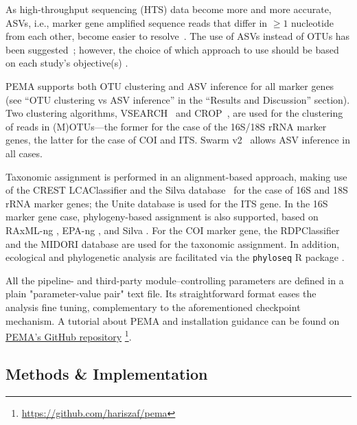    As high-throughput sequencing (HTS) data become more and more accurate, ASVs, i.e., marker gene amplified sequence reads that differ in $≥1$ nucleotide from each other, become easier to resolve~\citep{callahan2017exact}. 
   The use of ASVs instead of OTUs has been suggested~\citep{callahan2017exact}; 
   however, the choice of which approach to use should be based on each study's objective(s) \citep{pauvert2019bioinformatics}.
   
   PEMA supports both OTU clustering and ASV inference for all marker genes 
   (see “OTU clustering vs ASV inference” in the “Results and Discussion” section). 
   Two clustering algorithms, VSEARCH~\citep{rognes2016vsearch} and CROP~\citep{hao2011clustering}, are used for the clustering of reads in (M)OTUs—the former for the case of the 16S/18S rRNA marker genes, the latter for the case of COI and ITS. 
   Swarm v2~\citep{mahe2015swarm} allows ASV inference in all cases.
   
   Taxonomic assignment is performed in an alignment-based approach, making use of the CREST LCAClassifier \citep{lanzen2012crest} and the Silva database~\citep{quast2012silva} for the case of 16S and 18S rRNA marker genes; 
   the Unite database \citep{rillig2019role} is used for the ITS gene. 
   In the 16S marker gene case, phylogeny-based assignment is also supported, based on RAxML-ng \citep{kozlov2019raxml}, 
   EPA-ng \citep{barbera2019epa}, and Silva \citep{quast2012silva}. 
   For the COI marker gene, the RDPClassifier \citep{wang2007naive} and the MIDORI database \citep{machida2017metazoan} are used for the taxonomic assignment. 
   In addition, ecological and phylogenetic analysis are facilitated via the \texttt{phyloseq} R package \citep{mcmurdie2013phyloseq}.
   
   All the pipeline- and third-party module–controlling parameters are defined in a plain "parameter-value pair" text file. Its straightforward format eases the analysis fine tuning, complementary to the aforementioned checkpoint mechanism. A tutorial about PEMA and installation guidance can be found on \href{https://github.com/hariszaf/pema}{PEMA's GitHub repository} 
   \footnote{
      \href{https://github.com/hariszaf/pema}{https://github.com/hariszaf/pema}
   }.


   \subsection{Methods \& Implementation}

